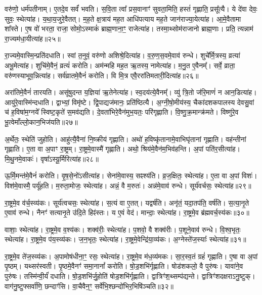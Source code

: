 वरु॑णो॒ धर्म॑पतीनाम्।
ए॒तदे॒व सर्वं॑ भवति।
स॒वि॒ता त्वा᳚ प्रस॒वानाꣳ॑ सुवता॒मिति॒ हस्तं॑ गृह्णाति॒ प्रसू᳚त्यै।
ये दे॑वा देवः॒ सुवः॒ स्थेत्या॑ह।
य॒था॒\-य॒जु\-रे॒वै\-तत्।
म॒ह॒ते क्ष॒त्राय॑ मह॒त आधि॑पत्याय मह॒ते जान॑राज्या॒येत्या॑ह।
आ॒\-मे॒वैतामा शा᳚स्ते।
ए॒ष वो॑ भरता॒ राजा॒ सोमो॒\-ऽस्माकं॑ ब्राह्म॒णाना॒ꣳ॒ राजेत्या॑ह।
तस्मा॒थ्सोम॑राजानो ब्राह्म॒णाः।
प्रति॒ त्यन्नाम॑ रा॒ज्यम॑धा॒यीत्या॑ह॥२५॥

रा॒ज्यमे॒वास्मि॒न्प्रति॑\-दधाति।
स्वां त॒नुवं॒ वरु॑णो अशिश्रे॒दि\-त्या॑ह।
व॒रु॒ण॒स॒वमे॒वाव॑ रुन्धे।
शुचे᳚र्मि॒त्रस्य॒ व्रत्या॑ अभू॒मेत्या॑ह।
शुचि॑मे॒वैनं॒ व्रत्यं॑ करोति।
अम॑न्महि मह॒त ऋ॒तस्य॒ नामेत्या॑ह।
म॒नु॒त ए॒वैनम्᳚।
सर्वे॒ व्राता॒ वरु॑णस्याभूव॒न्नित्या॑ह।
सर्व॑व्रातमे॒वैनं॑ करोति।
वि मि॒त्र एवै॒ररा॑तिमतारी॒दित्या॑ह॥२६॥

अरा॑तिमे॒वैनं॑ तारयति।
असू॑षुदन्त य॒ज्ञिया॑ ऋ॒तेनेत्या॑ह।
स्व॒दय॑त्ये॒वैनम्᳚।
व्यु॑ त्रि॒तो ज॑रि॒माणं॑ न आन॒डित्या॑ह।
आयु॑रे॒वास्मि॑न्दधाति।
द्वाभ्यां॒ विमृ॑ष्टे।
द्वि॒पाद्यज॑मानः॒ प्रति॑\-ष्ठित्यै।
अ॒ग्नी॒षो॒मीय॑स्य॒ चैका॑\-दश\-कपालस्य देवसु॒वां च॑ ह॒विषा॑म॒ग्नये᳚ स्विष्ट॒कृते॑ स॒मव॑द्यति।
दे॒वता॑भिरे॒वैन॑मुभ॒यतः॒ परि॑गृह्णाति।
वि॒ष्णु॒क्र॒मान्क्र॑मते।
विष्णु॑रे॒व भू॒त्वेमाँल्लो॒कान॒भि\-ज॑यति॥२७॥\anuvakamend[स॒त्याना॑मधा॒यीत्या॑हातारी॒दित्या॑ह क्रमत॒ एकं॑ च]

अ॒र्थेतः॒ स्थेति॑ जुहोति।
आहु॑त्यै॒वैना॑ नि॒ष्क्रीय॑ गृह्णाति।
अथो॑ ह॒विष्कृ॑तानामे॒वाभिघृ॑तानां गृह्णाति।
वह॑न्तीनां गृह्णाति।
ए॒ता वा अ॒पाꣳ रा॒ष्ट्रम्।
रा॒ष्ट्रमे॒वास्मै॑ गृह्णाति।
अथो॒ श्रिय॑मे॒वैन॑म॒भिव॑हन्ति।
अ॒पां पति॑र॒सीत्या॑ह।
मि॒थु॒नमे॒वाकः॑।
वृषा᳚\-ऽस्यू॒र्मिरित्या॑ह॥२८॥

ऊ॒र्मि॒मन्त॑मे॒वैनं॑ करोति।
वृ॒ष॒से॒नो॑\-ऽसीत्या॑ह।
सेना॑मे॒वास्य॒ सꣴश्य॑ति।
व्र॒ज॒क्षितः॒ स्थेत्या॑ह।
ए॒ता वा अ॒पां विशः॑।
विश॑मे॒वास्मै॒ पर्यू॑हति।
म॒रुता॒मोजः॒ स्थेत्या॑ह।
अन्नं॒ वै म॒रुतः॑।
अन्न॑मे॒वाव॑ रुन्धे।
सूर्य॑वर्चसः॒ स्थेत्या॑ह॥२९॥

रा॒ष्ट्रमे॒व व॑र्च॒स्व्य॑कः।
सूर्य॑त्वचसः॒ स्थेत्या॑ह।
स॒त्यं वा ए॒तत्।
यद्वर्\mbox{}ष॑ति।
अनृ॑तं॒ यदा॒तप॑ति॒ वर्\mbox{}ष॑ति।
स॒त्या॒नृ॒ते ए॒वाव॑ रुन्धे।
नैनꣳ॑ सत्यानृ॒ते उ॑दि॒ते हिꣴ॑स्तः।
य ए॒वं वेद॑।
मान्दाः॒ स्थेत्या॑ह।
रा॒ष्ट्रमे॒व ब्र॑ह्म\-वर्च॒स्य॑कः॥३०॥

वाशाः॒ स्थेत्या॑ह।
रा॒ष्ट्रमे॒व व॒श्य॑कः।
शक्व॑रीः॒ स्थेत्या॑ह।
प॒शवो॒ वै शक्व॑रीः।
प॒शूने॒वाव॑ रुन्धे।
वि॒श्व॒भृतः॒ स्थेत्या॑ह।
रा॒ष्ट्रमे॒व प॑य॒स्व्य॑कः।
ज॒न॒भृतः॒ स्थेत्या॑ह।
रा॒ष्ट्रमे॒वेन्द्रि॑या॒व्य॑कः।
अ॒ग्नेस्ते॑ज॒स्याः᳚ स्थेत्या॑ह॥३१॥

रा॒ष्ट्रमे॒व ते॑ज॒स्व्य॑कः।
अ॒पामोष॑धीना॒ꣳ॒ रसः॒ स्थेत्या॑ह।
रा॒ष्ट्रमे॒व म॑ध॒व्य॑मकः।
सा॒र॒स्व॒तं ग्रहं॑ गृह्णाति।
ए॒षा वा अ॒पां पृ॒ष्ठम्।
यथ्सर॑स्वती।
पृ॒ष्ठमे॒वैनꣳ॑ समा॒नानां᳚ करोति।
षो॒ड॒शभि॑र्गृह्णाति।
षोड॑शकलो॒ वै पुरु॑षः।
यावा॑ने॒व पुरु॑षः।
तस्मि॑न्वी॒र्यं॑ दधाति।
षो॒ड॒शभि॑र्जु॒होति॑ षोड॒शभि॑र्गृह्णाति।
द्वात्रिꣳ॑श॒थ्सम्प॑द्यन्ते।
द्वात्रिꣳ॑शदक्षरा\-ऽनु॒ष्टुक्।
वाग॑नु॒ष्टुफ्सर्वा॑णि॒ छन्दाꣳ॑सि।
वा॒चैवैन॒ꣳ॒ सर्वे॑भि॒श्छन्दो॑भिर॒भिषि॑ञ्चति॥३२॥\anuvakamend[ऊ॒र्मिरित्या॑ह॒ सूर्य॑वर्चसः॒ स्थेत्या॑ह ब्रह्मवर्च॒स्य॑कस्तेज॒स्याः᳚ स्थेत्या॑है॒व पुरु॑षः॒ षट् च॑]


